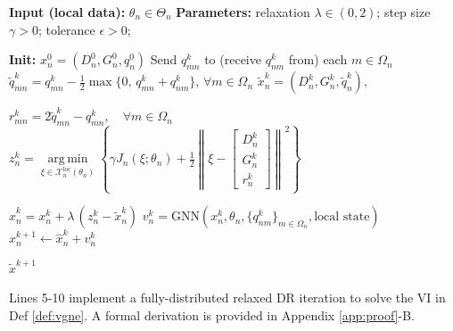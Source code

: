\documentclass[final]{l4dc2026}
\begin{document}
\begin{algorithm}[H]
\caption{Learning-enhanced Market Clearing}
\label{alg:alg1}
\label{alg:learned_dr}
\begin{algorithmic}[1]
\STATE \textbf{Input (local data):} $\theta_n \in \Theta_n$
\STATE \textbf{Parameters:} relaxation $\lambda \in (0,2)$; step size $\gamma > 0$; tolerance $\epsilon>0$;

\STATE \textbf{Init:} $x_n^0 = (D_n^0, G_n^0, q_n^0)$
  \STATE Send $q_{mn}^{k}$ to (receive $q_{nm}^{k}$ from) each $m \in \Omega_n$
  \STATE $\tilde q_{mn}^{k} = q_{mn}^{k} - \tfrac{1}{2} \max\{0,\, q_{mn}^{k} + q_{nm}^{k}\}$,
         \quad $\forall m \in \Omega_n$
    \STATE
    $
    \tilde x_n^k
    =
    (D_n^k,G_n^k,\tilde q_n^k),
    $

  \STATE $r_{mn}^{k} = 2\tilde q_{mn}^{k} - q_{mn}^{k}, \quad \forall m \in \Omega_n$\\[.2em]
  \STATE
    $
    z_n^k
    =
    \underset{\xi\in\mathcal{X}_n^{\mathrm{\text{loc}}}(\theta_n)}
    {\operatorname{arg\,min}}
    \left\{
        \gamma J_n(\xi;\theta_n)
        +
        \frac{1}{2}
        \left\|
            \xi
            -
            \left[ \begin{smallmatrix}
                D_n^k\\
                G_n^k\\
                r_n^k
            \end{smallmatrix}\right]
        \right\|^2
    \right\}
    $


  \STATE $\hat x_{n}^{k} = x_{n}^{k} + \lambda\,(z_n^{k} - \tilde x_n^k)$
  \STATE $v_n^k = \text{GNN}(x^k_n, \theta_n, \{q^k_{nm}\}_{m\in\Omega_n}, \text{local state})$
  \STATE $x_n^{k+1} \gets \hat x_n^{k} + v_n^k$

\ENDFOR
\RETURN $\tilde x^{k+1}$%
\end{algorithmic}
\end{algorithm}
Lines 5-10 implement a fully-distributed relaxed DR iteration to solve the VI in Def \ref{def:vgne}. %
A formal derivation is provided in Appendix \ref{app:proof}-B.
\end{document}
